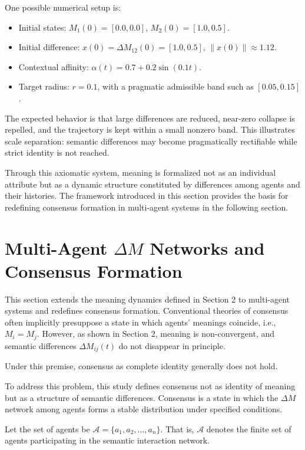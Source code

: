 \documentclass[11pt,a4paper]{article}
\theoremstyle{definition}
\begin{document}
One possible numerical setup is:
\begin{itemize}
\item Initial states: $M_1(0) = [0.0, 0.0]$, $M_2(0) = [1.0, 0.5]$.
\item Initial difference: $x(0)=\Delta M_{12}(0)=[1.0,0.5]$, $\|x(0)\|\approx 1.12$.
\item Contextual affinity: $\alpha(t)=0.7+0.2\sin(0.1t)$.
\item Target radius: $r=0.1$, with a pragmatic admissible band such as $[0.05,0.15]$.
\end{itemize}

The expected behavior is that large differences are reduced, near-zero collapse is repelled, and the trajectory is kept within a small nonzero band. This illustrates scale separation: semantic differences may become pragmatically rectifiable while strict identity is not reached.

Through this axiomatic system, meaning is formalized not as an individual attribute but as a dynamic structure constituted by differences among agents and their histories. The framework introduced in this section provides the basis for redefining consensus formation in multi-agent systems in the following section.

\section{Multi-Agent $\Delta M$ Networks and Consensus Formation}

This section extends the meaning dynamics defined in Section 2 to multi-agent systems and redefines consensus formation. Conventional theories of consensus often implicitly presuppose a state in which agents' meanings coincide, i.e., $M_i = M_j$. However, as shown in Section 2, meaning is non-convergent, and semantic differences $\Delta M_{ij}(t)$ do not disappear in principle.

Under this premise, consensus as complete identity generally does not hold.

To address this problem, this study defines consensus not as identity of meaning but as a structure of semantic differences. Consensus is a state in which the $\Delta M$ network among agents forms a stable distribution under specified conditions.

Let the set of agents be $\mathcal{A} = \{a_1, a_2, \ldots, a_n\}$. That is, $\mathcal{A}$ denotes the finite set of agents participating in the semantic interaction network.
\end{document}
